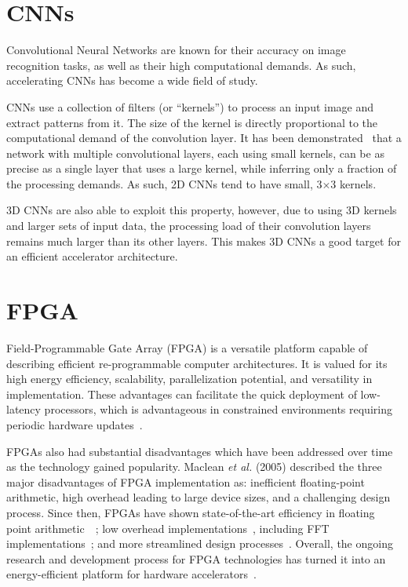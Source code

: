 \section{CNNs}

Convolutional Neural Networks are known for their accuracy on image recognition tasks, as well as their high computational demands. As such, accelerating CNNs has become a wide field of study.

CNNs use a collection of filters (or ``kernels'') to process an input image and extract patterns from it. The size of the kernel is directly proportional to the computational demand of the convolution layer. It has been demonstrated~\cite{simonyan2014very} that a network with multiple convolutional layers, each using small kernels, can be as precise as a single layer that uses a large kernel, while inferring only a fraction of the processing demands. As such, 2D CNNs tend to have small, 3$\times$3 kernels.

3D CNNs are also able to exploit this property, however, due to using 3D kernels and larger sets of input data, the processing load of their convolution layers remains much larger than its other layers. This makes 3D CNNs a good target for an efficient accelerator architecture.

\section{FPGA}

Field-Programmable Gate Array (FPGA) is a versatile platform capable of describing efficient re-programmable computer architectures. It is valued for its high energy efficiency, scalability, parallelization potential, and versatility in implementation. These advantages can facilitate the quick deployment of low-latency processors, which is advantageous in constrained environments requiring periodic hardware updates~\cite{garvey2003use}.

FPGAs also had substantial disadvantages which have been addressed over time as the technology gained popularity. Maclean \textit{et al.} (2005) \cite{maclean2005evaluation} described the three major disadvantages of FPGA implementation as: inefficient floating-point arithmetic, high overhead leading to large device sizes, and a challenging design process. Since then, FPGAs have shown state-of-the-art efficiency in floating point arithmetic~\cite{lian2019high}~\cite{de2022fast}; low overhead implementations~\cite{zhou2019fpga}, including FFT implementations~\cite{wang2020low}; and more streamlined design processes~\cite{haris2021secda}. Overall, the ongoing research and development process for FPGA technologies has turned it into an energy-efficient platform for hardware accelerators~\cite{ullah2020energy}.

